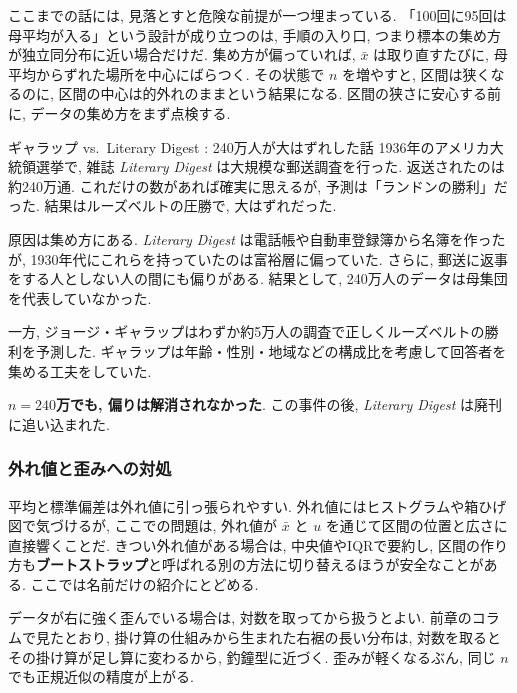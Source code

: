     ここまでの話には, 見落とすと危険な前提が一つ埋まっている.
    「100回に95回は母平均が入る」という設計が成り立つのは, 手順の入り口, つまり標本の集め方が独立同分布に近い場合だけだ.
    集め方が偏っていれば, $\bar{x}$ は取り直すたびに, 母平均からずれた場所を中心にばらつく.
    その状態で $n$ を増やすと, 区間は狭くなるのに, 区間の中心は的外れのままという結果になる.
    区間の狭さに安心する前に, データの集め方をまず点検する.

    \begin{mybox}{ギャラップ vs.\ Literary Digest : 240万人が大はずれした話}
    1936年のアメリカ大統領選挙で, 雑誌 \textit{Literary Digest} は大規模な郵送調査を行った.
    返送されたのは約240万通.
    これだけの数があれば確実に思えるが, 予測は「ランドンの勝利」だった.
    結果はルーズベルトの圧勝で, 大はずれだった.

    原因は集め方にある.
    \textit{Literary Digest} は電話帳や自動車登録簿から名簿を作ったが, 1930年代にこれらを持っていたのは富裕層に偏っていた.
    さらに, 郵送に返事をする人としない人の間にも偏りがある.
    結果として, 240万人のデータは母集団を代表していなかった.

    一方, ジョージ・ギャラップはわずか約5万人の調査で正しくルーズベルトの勝利を予測した.
    ギャラップは年齢・性別・地域などの構成比を考慮して回答者を集める工夫をしていた.

    \textbf{$n = 240$万でも, 偏りは解消されなかった}.
    この事件の後, \textit{Literary Digest} は廃刊に追い込まれた.\footnotemark
    \end{mybox}

    \subsubsection*{外れ値と歪みへの対処}

    平均と標準偏差は外れ値に引っ張られやすい.
    外れ値にはヒストグラムや箱ひげ図で気づけるが, ここでの問題は, 外れ値が $\bar{x}$ と $u$ を通じて区間の位置と広さに直接響くことだ.
    きつい外れ値がある場合は, 中央値やIQRで要約し, 区間の作り方も\textbf{ブートストラップ}と呼ばれる別の方法に切り替えるほうが安全なことがある.
    ここでは名前だけの紹介にとどめる.

    データが右に強く歪んでいる場合は, 対数を取ってから扱うとよい.
    前章のコラムで見たとおり, 掛け算の仕組みから生まれた右裾の長い分布は, 対数を取るとその掛け算が足し算に変わるから, 釣鐘型に近づく.
    歪みが軽くなるぶん, 同じ $n$ でも正規近似の精度が上がる.

